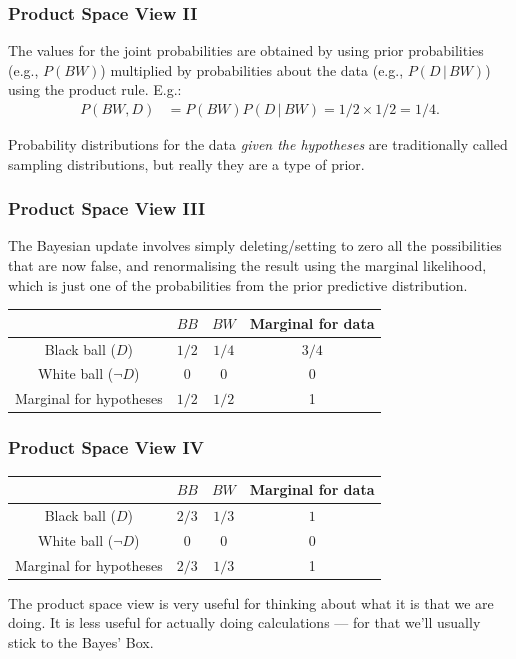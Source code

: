 \documentclass{beamer}
\newcommand{\given}{\,|\,}
\begin{document}
\begin{frame}
\frametitle{Product Space View II}
The values for the joint probabilities are obtained by using
prior probabilities (e.g., $P(BW)$) multiplied by
probabilities about the data (e.g., $P(D \given BW)$) using the product
rule. E.g.:
\begin{align}
P(BW, D) &= P(BW)P(D \given BW) = 1/2 \times 1/2 = 1/4.
\end{align}

\pause

Probability distributions for the data {\em given the hypotheses} are
traditionally called sampling distributions, but really they are
a type of prior.

\end{frame}



\begin{frame}
\frametitle{Product Space View III}
The Bayesian update involves simply deleting/setting to zero
all the possibilities that are now false, and renormalising the
result using the marginal likelihood, which is just one of the
probabilities from the prior predictive distribution.
\begin{center}
\begin{tabular}{|c|cc|c|}
\hline
   &  $BB$ &  $BW$ & Marginal for data\\
\hline
Black ball ($D$)      &  $1/2$  &  $1/4$     & $3/4$\\
\rowcolor{LightRed}
White ball ($\neg D$) &  0      &  0     & 0 \\
\hline
Marginal for hypotheses  &  $1/2$  & $1/2$  & 1\\
\hline
\end{tabular}
\end{center}

\end{frame}

\begin{frame}
\frametitle{Product Space View IV}
\begin{center}
\begin{tabular}{|c|cc|c|}
\hline
   &  $BB$ &  $BW$ & Marginal for data\\
\hline
\rowcolor{LightGreen}
Black ball ($D$)      &  $2/3$  &  $1/3$     & $1$\\
\rowcolor{LightRed}
White ball ($\neg D$) &  0      &  0     & 0 \\
\hline
Marginal for hypotheses  &  $2/3$  & $1/3$  & 1\\
\hline
\end{tabular}
\end{center}

\pause
The product space view is very useful for thinking about
what it is that we are doing. It is less useful for actually
doing calculations --- for that we'll usually stick to the Bayes'
Box.
\end{frame}
\end{document}
